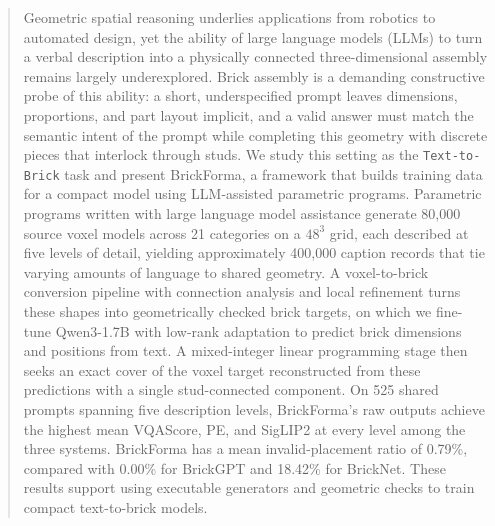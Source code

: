 \begin{abstract}
Geometric spatial reasoning underlies applications from robotics to automated design, yet the ability of large language models (LLMs) to turn a verbal description into a physically connected three-dimensional assembly remains largely underexplored. Brick assembly is a demanding constructive probe of this ability: a short, underspecified prompt leaves dimensions, proportions, and part layout implicit, and a valid answer must match the semantic intent of the prompt while completing this geometry with discrete pieces that interlock through studs. We study this setting as the \texttt{Text-to-Brick} task and present BrickForma, a framework that builds training data for a compact model using LLM-assisted parametric programs. Parametric programs written with large language model assistance generate 80,000 source voxel models across 21 categories on a $48^3$ grid, each described at five levels of detail, yielding approximately 400,000 caption records that tie varying amounts of language to shared geometry. A voxel-to-brick conversion pipeline with connection analysis and local refinement turns these shapes into geometrically checked brick targets, on which we fine-tune Qwen3-1.7B with low-rank adaptation to predict brick dimensions and positions from text. A mixed-integer linear programming stage then seeks an exact cover of the voxel target reconstructed from these predictions with a single stud-connected component. On 525 shared prompts spanning five description levels, BrickForma's raw outputs achieve the highest mean VQAScore, PE, and SigLIP2 at every level among the three systems. BrickForma has a mean invalid-placement ratio of 0.79\%, compared with 0.00\% for BrickGPT and 18.42\% for BrickNet. These results support using executable generators and geometric checks to train compact text-to-brick models.
\end{abstract}